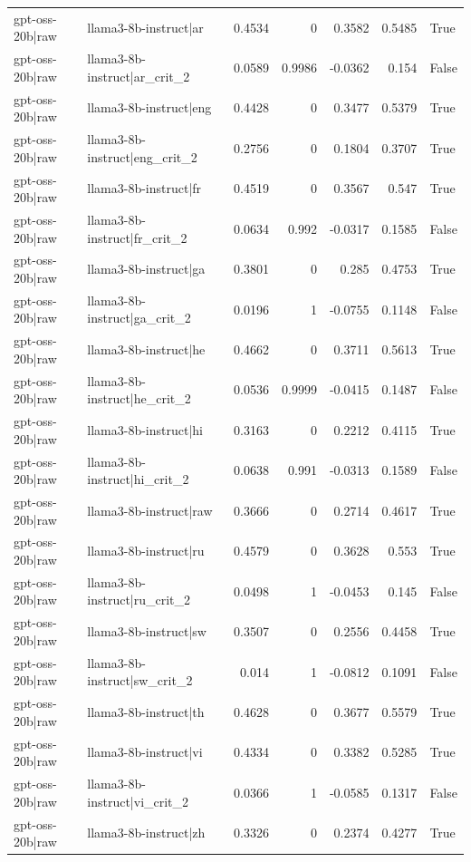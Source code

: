 \begin{table}
\begin{tabular}{l l r r r r l}
gpt-oss-20b|raw & llama3-8b-instruct|ar & 0.4534 & 0 & 0.3582 & 0.5485 & True \\
gpt-oss-20b|raw & llama3-8b-instruct|ar_crit_2 & 0.0589 & 0.9986 & -0.0362 & 0.154 & False \\
gpt-oss-20b|raw & llama3-8b-instruct|eng & 0.4428 & 0 & 0.3477 & 0.5379 & True \\
gpt-oss-20b|raw & llama3-8b-instruct|eng_crit_2 & 0.2756 & 0 & 0.1804 & 0.3707 & True \\
gpt-oss-20b|raw & llama3-8b-instruct|fr & 0.4519 & 0 & 0.3567 & 0.547 & True \\
gpt-oss-20b|raw & llama3-8b-instruct|fr_crit_2 & 0.0634 & 0.992 & -0.0317 & 0.1585 & False \\
gpt-oss-20b|raw & llama3-8b-instruct|ga & 0.3801 & 0 & 0.285 & 0.4753 & True \\
gpt-oss-20b|raw & llama3-8b-instruct|ga_crit_2 & 0.0196 & 1 & -0.0755 & 0.1148 & False \\
gpt-oss-20b|raw & llama3-8b-instruct|he & 0.4662 & 0 & 0.3711 & 0.5613 & True \\
gpt-oss-20b|raw & llama3-8b-instruct|he_crit_2 & 0.0536 & 0.9999 & -0.0415 & 0.1487 & False \\
gpt-oss-20b|raw & llama3-8b-instruct|hi & 0.3163 & 0 & 0.2212 & 0.4115 & True \\
gpt-oss-20b|raw & llama3-8b-instruct|hi_crit_2 & 0.0638 & 0.991 & -0.0313 & 0.1589 & False \\
gpt-oss-20b|raw & llama3-8b-instruct|raw & 0.3666 & 0 & 0.2714 & 0.4617 & True \\
gpt-oss-20b|raw & llama3-8b-instruct|ru & 0.4579 & 0 & 0.3628 & 0.553 & True \\
gpt-oss-20b|raw & llama3-8b-instruct|ru_crit_2 & 0.0498 & 1 & -0.0453 & 0.145 & False \\
gpt-oss-20b|raw & llama3-8b-instruct|sw & 0.3507 & 0 & 0.2556 & 0.4458 & True \\
gpt-oss-20b|raw & llama3-8b-instruct|sw_crit_2 & 0.014 & 1 & -0.0812 & 0.1091 & False \\
gpt-oss-20b|raw & llama3-8b-instruct|th & 0.4628 & 0 & 0.3677 & 0.5579 & True \\
gpt-oss-20b|raw & llama3-8b-instruct|vi & 0.4334 & 0 & 0.3382 & 0.5285 & True \\
gpt-oss-20b|raw & llama3-8b-instruct|vi_crit_2 & 0.0366 & 1 & -0.0585 & 0.1317 & False \\
gpt-oss-20b|raw & llama3-8b-instruct|zh & 0.3326 & 0 & 0.2374 & 0.4277 & True \\

\end{tabular}
\end{table}
